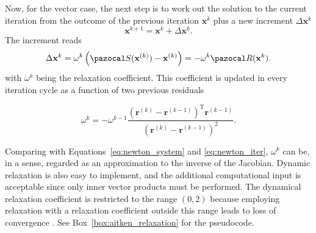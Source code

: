 Now, for the vector case, the next step is to work out the solution to the current iteration from the outcome of the previous iteration $\mathbf{x}^{k}$ plus a new increment $\Delta \mathbf{x}^{k}$
\begin{equation}
\mathbf{x}^{k+1}=\mathbf{x}^{k}+\Delta \mathbf{x}^{k}.
\end{equation}
The increment reads
\begin{equation} \label{eq:aitken_update}
\Delta \mathbf{x}^{k}=\omega^{k}\left(\pazocal S(\mathbf{x}^{(k)})-\mathbf{x}^{(k)}\right)=-\omega^{k} \pazocal R(\mathbf x^k).
\end{equation}
with $\omega^{k}$ being the relaxation coefficient.
This coefficient is updated in every iteration cycle as a function of two previous residuals
\begin{highlight}
  \begin{equation} \label{eq:aitken_relaxation_factor}
    \omega^{k}=-\omega^{k-1} \frac{\left(\mathbf{r}^{(k)}-\mathbf{r}^{(k-1)}\right)^{\mathrm{T}} \mathbf{r}^{(k-1)}}{\left(\mathbf{r}^{(k)}-\mathbf{r}^{(k-1)}\right)^{2}}.
  \end{equation}
\end{highlight}
Comparing with Equations~\eqref{eq:newton_system} and \eqref{eq:newton_iter}, \(\omega^{k}\) can be, in a sense, regarded as an approximation to the inverse of the Jacobian.
Dynamic relaxation is also easy to implement, and the additional computational input is acceptable since only inner vector products must be performed.
The dynamical relaxation coefficient is restricted to the range \((0,2)\) because employing relaxation with a relaxation coefficient outside this range leads to loss of convergence \citep{erbts_accelerated_2012}.
See Box~\ref{box:aitken_relaxation} for the pseudocode.

